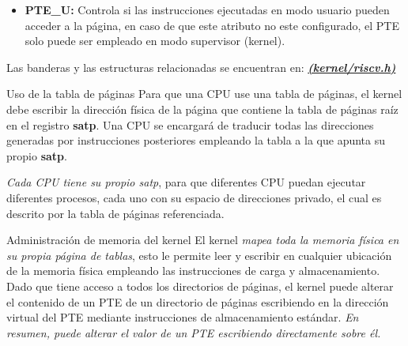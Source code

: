 \documentclass{libs/ufc_format}
\begin{document}
\begin{frame}{}
  \begin{itemize}
    \item \textbf{PTE\_U:} Controla si las instrucciones ejecutadas en modo usuario pueden acceder a la página, en caso de que este atributo no este configurado, el PTE solo puede ser empleado en modo supervisor (kernel).
  \end{itemize}

  \vspace{0.3cm}

  Las banderas y las estructuras relacionadas se encuentran en: \href{https://github.com/CarlosSandoval-03/xv6-riscv/blob/riscv/kernel/riscv.h}{\textbf{\textit{(kernel/riscv.h)}}} \cite{xv6_book} \cite{xv6}
\end{frame}
\begin{frame}{Uso de la tabla de páginas}
  Para que una CPU use una tabla de páginas, el kernel debe escribir la dirección física de la página que contiene la tabla de páginas raíz en el registro \textbf{satp}. Una CPU se encargará de traducir todas las direcciones generadas por instrucciones posteriores empleando la tabla a la que apunta su propio \textbf{satp}. \cite{xv6_book}

  \vspace{0.3cm}

  \emph{Cada CPU tiene su propio satp}, para que diferentes CPU puedan ejecutar diferentes procesos, cada uno con su espacio de direcciones privado, el cual es descrito por la tabla de páginas referenciada. \cite{xv6_book}
\end{frame}
\begin{frame}{Administración de memoria del kernel}
  El kernel \emph{mapea toda la memoria física en su propia página de tablas}, esto le permite leer y escribir en cualquier ubicación de la memoria física empleando las instrucciones de carga y almacenamiento. Dado que tiene acceso a todos los directorios de páginas, el kernel puede alterar el contenido de un PTE de un directorio de páginas escribiendo en la dirección virtual del PTE mediante instrucciones de almacenamiento estándar. \emph{En resumen, puede alterar el valor de un PTE escribiendo directamente sobre él. \cite{xv6_book}}
\end{frame}
\end{document}
